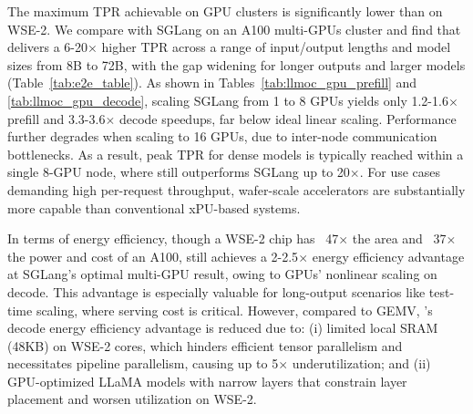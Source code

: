 \begin{table}[t]
  \centering
  \caption{Comparing \sys(WSE-2) with SGLang(A100) in decode throughput and energy.}
  \vspace{-0.3cm}
  \label{tab:llmoc_gpu_decode}%
\end{table}%

 The maximum TPR achievable on GPU clusters is significantly lower than on WSE-2. We compare \sys with SGLang on an A100 multi-GPUs cluster and find that \sys delivers a 6-20$\times$ higher TPR across a range of input/output lengths and model sizes from 8B to 72B, with the gap widening for longer outputs and larger models (Table~\ref{tab:e2e_table}). As shown in Tables~\ref{tab:llmoc_gpu_prefill} and \ref{tab:llmoc_gpu_decode}, scaling SGLang from 1 to 8 GPUs yields only 1.2-1.6$\times$ prefill and 3.3-3.6$\times$ decode speedups, far below ideal linear scaling. Performance further degrades when scaling to 16 GPUs, due to inter-node communication bottlenecks. As a result, peak TPR for dense models is typically reached within a single 8-GPU node, where \sys still outperforms SGLang up to 20$\times$. For use cases demanding high per-request throughput, wafer-scale accelerators are substantially more capable than conventional xPU-based systems.

In terms of energy efficiency, though a WSE-2 chip has ~47$\times$ the area and ~37$\times$ the power and cost of an A100, \sys still achieves a 2-2.5$\times$ energy efficiency advantage at SGLang's optimal multi-GPU result, owing to GPUs' nonlinear scaling on decode. This advantage is especially valuable for long-output scenarios like test-time scaling, where serving cost is critical. However, compared to GEMV, \sys's decode energy efficiency advantage is reduced due to: (i) limited local SRAM (48KB) on WSE-2 cores, which hinders efficient tensor parallelism and necessitates pipeline parallelism, causing up to 5$\times$ underutilization; and (ii) GPU-optimized LLaMA models with narrow layers that constrain layer placement and worsen utilization on WSE-2.

